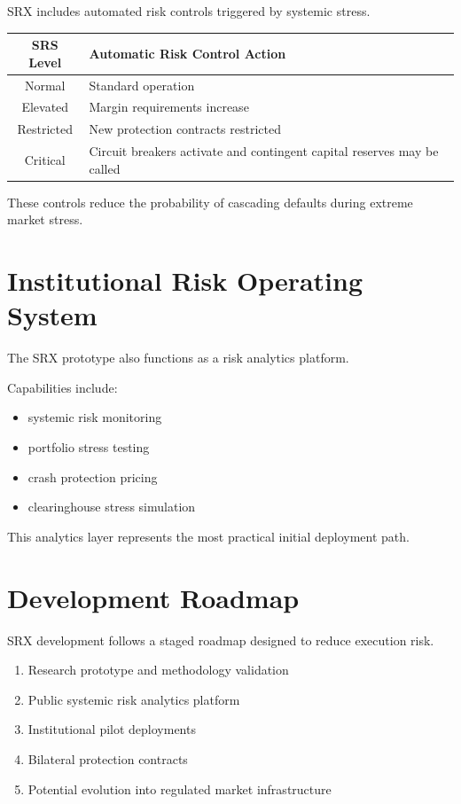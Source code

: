 \documentclass[11pt]{article}
\begin{document}
SRX includes automated risk controls triggered by systemic stress.

\begin{center}
\begin{tabular}{|c|p{9cm}|}
\hline
\textbf{SRS Level} & \textbf{Automatic Risk Control Action} \\
\hline
Normal & Standard operation \\
\hline
Elevated & Margin requirements increase \\
\hline
Restricted & New protection contracts restricted \\
\hline
Critical & Circuit breakers activate and contingent capital reserves may be called \\
\hline
\end{tabular}
\end{center}

These controls reduce the probability of cascading defaults during extreme market stress.

\section{Institutional Risk Operating System}

The SRX prototype also functions as a risk analytics platform.

Capabilities include:

\begin{itemize}
\item systemic risk monitoring
\item portfolio stress testing
\item crash protection pricing
\item clearinghouse stress simulation
\end{itemize}

This analytics layer represents the most practical initial deployment path.

\section{Development Roadmap}

SRX development follows a staged roadmap designed to reduce execution risk.

\begin{enumerate}
\item Research prototype and methodology validation
\item Public systemic risk analytics platform
\item Institutional pilot deployments
\item Bilateral protection contracts
\item Potential evolution into regulated market infrastructure
\end{enumerate}
\end{document}
